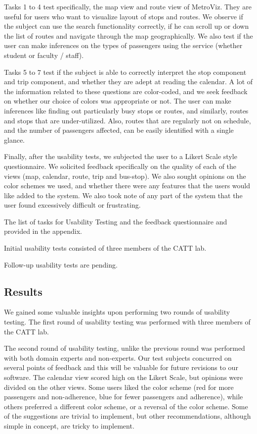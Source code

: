 \documentclass[journal]{vgtc}                %
\begin{document}
Tasks 1 to 4 test specifically, the map view and route view of MetroViz. They are useful for users who want to visualize layout of stops and routes. We observe if the subject can use the search functionality correctly, if he can scroll up or down the list of routes and navigate through the map geographically. We also test if the user can make inferences on the types of passengers using the service (whether student or faculty / staff). 

Tasks 5 to 7 test if the subject is able to correctly interpret the stop component and trip component, and whether they are adept at reading the calendar. A lot of the information related to these questions are color-coded, and we seek feedback on whether our choice of colors was appropriate or not. The user can make inferences like finding out particularly busy stops or routes, and similarly, routes and stops that are under-utilized. Also, routes that are regularly not on schedule, and the number of passengers affected, can be easily identified with a single glance.

Finally, after the usability tests, we subjected the user to a Likert Scale style questionnaire. We solicited feedback specifically on the quality of each of the views (map, calendar, route, trip and bus-stop). We also sought opinions on the color schemes we used, and whether there were any features that the users would like added to the system. We also took note of any part of the system that the user found excessively difficult or frustrating.

The list of tasks for Usability Testing and the feedback questionnaire and provided in the appendix. 

Initial usability tests consisted of three members of the CATT lab.

Follow-up usability tests are pending.

\subsection{Results}
We gained some valuable insights upon performing two rounds of usability testing. The first round of usability testing was performed with three members of the CATT lab. 

The second round of usability testing, unlike the previous round was performed with both domain experts and non-experts. Our test subjects concurred on several points of feedback and this will be valuable for future revisions to our software. The calendar view scored high on the Likert Scale, but opinions were divided on the other views. Some users liked the color scheme (red for more passengers and non-adherence, blue for fewer passengers and adherence), while others preferred a different color scheme, or a reversal of the color scheme. Some of the suggestions are trivial to implement, but other recommendations, although simple in concept, are tricky to implement. 
\end{document}
